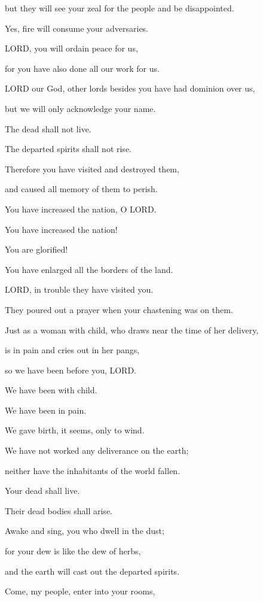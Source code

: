 but they will see your zeal for the people and be disappointed.

Yes, fire will consume your adversaries.

\myverse{}LORD, you will ordain peace for us,

for you have also done all our work for us.

\myverse{}LORD our God, other lords besides you have had dominion over
us,

but we will only acknowledge your name.

\myverse{}The dead shall not live.

The departed spirits shall not rise.

Therefore you have visited and destroyed them,

and caused all memory of them to perish.

\myverse{}You have increased the nation, O LORD.

You have increased the nation!

You are glorified!

You have enlarged all the borders of the land.


\vspace{\baselineskip} \myverse{}LORD, in trouble they have visited you.

They poured out a prayer when your chastening was on them.

\myverse{}Just as a woman with child, who draws near the time of her
delivery,

is in pain and cries out in her pangs,

so we have been before you, LORD.

\myverse{}We have been with child.

We have been in pain.

We gave birth, it seems, only to wind.

We have not worked any deliverance on the earth;

neither have the inhabitants of the world fallen.

\myverse{}Your dead shall live.

Their dead bodies shall arise.

Awake and sing, you who dwell in the dust;

for your dew is like the dew of herbs,

and the earth will cast out the departed spirits.


\vspace{\baselineskip} \myverse{}Come, my people, enter into your rooms,

